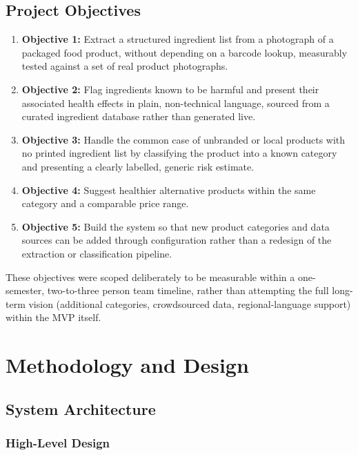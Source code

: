 \documentclass{report}
\begin{document}
\section{Project Objectives}

\begin{enumerate}
  \item \textbf{Objective 1:} Extract a structured ingredient list from a
    photograph of a packaged food product, without depending on a
    barcode lookup, measurably tested against a set of real product
    photographs.
  \item \textbf{Objective 2:} Flag ingredients known to be harmful and
    present their associated health effects in plain, non-technical
    language, sourced from a curated ingredient database rather than
    generated live.
  \item \textbf{Objective 3:} Handle the common case of unbranded or
    local products with no printed ingredient list by classifying the
    product into a known category and presenting a clearly labelled,
    generic risk estimate.
  \item \textbf{Objective 4:} Suggest healthier alternative products
    within the same category and a comparable price range.
  \item \textbf{Objective 5:} Build the system so that new product
    categories and data sources can be added through configuration
    rather than a redesign of the extraction or classification
    pipeline.
\end{enumerate}

These objectives were scoped deliberately to be measurable within a
one-semester, two-to-three person team timeline, rather than attempting
the full long-term vision (additional categories, crowdsourced data,
regional-language support) within the MVP itself.


\chapter{Methodology and Design}

\section{System Architecture}

\subsection{High-Level Design}
\end{document}
